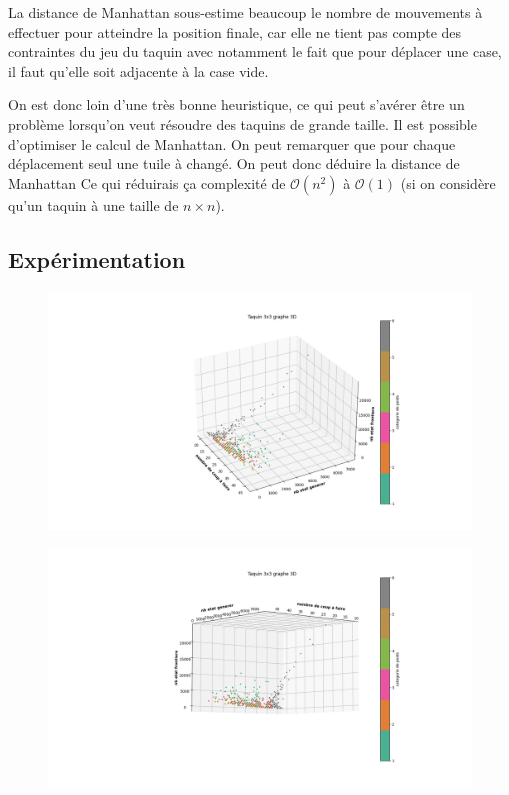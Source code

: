 \documentclass[a4paper, 12pt]{article}
\begin{document}
La distance de Manhattan sous-estime beaucoup le nombre de mouvements à effectuer pour atteindre la position finale, car elle ne tient pas compte des contraintes du jeu du taquin avec notamment le fait que pour déplacer une case, il faut qu'elle soit adjacente à la case vide.

On est donc loin d'une très bonne heuristique, ce qui peut s'avérer être un problème lorsqu'on veut résoudre des taquins de grande taille.
Il est possible d'optimiser le calcul de Manhattan. On peut remarquer que pour chaque déplacement seul une tuile à changé. On peut donc déduire la distance de Manhattan Ce qui réduirais ça complexité de $\mathcal{O}(n^{2})$ à $\mathcal{O}(1)$ (si on considère qu'un taquin à une taille de $n \times n$).

\subsection{Expérimentation}
\begin{figure}[H]
    \centering
    \includegraphics[width=\textwidth]{graphe 3d Taquin 3x3}
\end{figure}
\begin{figure}[H]
    \centering
    \includegraphics[width=\textwidth]{graphe 3d Taquin 3x3(1)}
\end{figure}
\end{document}
